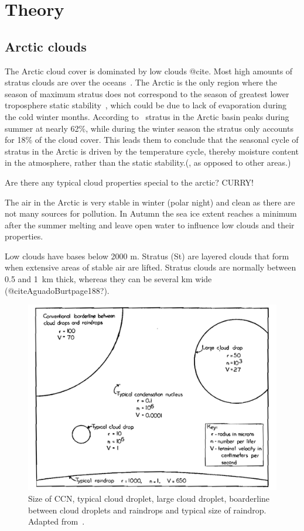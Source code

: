 \chapter{Theory}
\label{chap:theory}
\section{Arctic clouds}
The Arctic cloud cover is dominated by low clouds @cite. Most high amounts of stratus clouds are over the oceans~\citep{Klein1993}. The Arctic is the only region where the season of maximum stratus does not correspond to the season of greatest lower troposphere static stability~\citep{Klein1993}, which could be due to lack of evaporation during the cold winter months. According to~\citet{Klein1993} stratus in the Arctic basin peaks during summer at nearly 62\%, while during the winter season the stratus only accounts for 18\% of the cloud cover. This leads them to conclude that the seasonal cycle of stratus in the Arctic is driven by the temperature cycle, thereby moisture content in the atmosphere, rather than the static stability.(, as opposed to other areas.)

Are there any typical cloud properties special to the arctic? CURRY!


The air in the Arctic is very stable in winter (polar night) and clean as there are not many sources for pollution. In Autumn the sea ice extent reaches a minimum after the summer melting and leave open water to influence low clouds and their properties. 

Low clouds have bases below 2000 m. Stratus (St) are layered clouds that form when extensive areas of stable air are lifted. Stratus clouds are normally between 0.5 and 1~km thick, whereas they can be several km wide (@citeAguadoBurtpage188?).

\begin{figure}
\label{fig:dropletsize}
\centering
\includegraphics[width=1\textwidth]{theory/dropletsize.png}
\caption{Size of CCN, typical cloud droplet, large cloud droplet, boarderline between cloud droplets and raindrops and typical size of raindrop. Adapted from~\citep{McDonald1958}.}
\label{fig:Schf01}
\end{figure}
 
